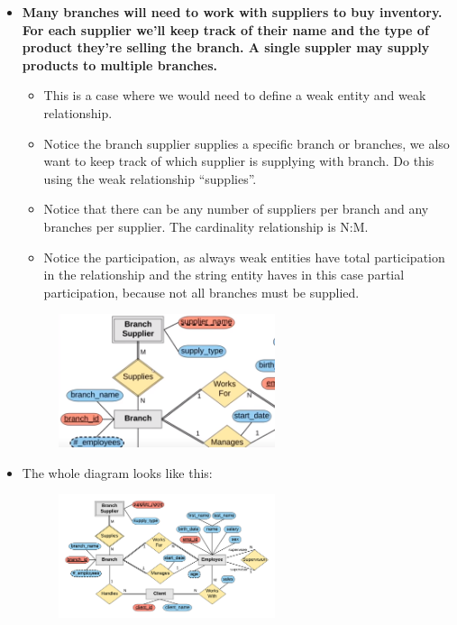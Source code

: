 \begin{itemize}
    \item \textbf{Many branches will need to work with suppliers to buy inventory. For each supplier we'll keep track of their name and the type of product they're selling the branch. A single suppler may supply products to multiple branches.}
        \begin{itemize}
            \item This is a case where we would need to define a weak entity and weak relationship.
            \item Notice the branch supplier supplies a specific branch or branches, we also want to keep track of which supplier is supplying with branch. Do this using the weak relationship ``supplies''.
            \item Notice that there can be any number of suppliers per branch and any branches per supplier. The cardinality relationship is N:M.
            \item Notice the participation, as always weak entities have total participation in the relationship and the string entity haves in this case partial participation, because not all branches must be supplied. 
        \end{itemize}
        \begin{figure}[H]
            \centering
            \includegraphics[width=0.6\textwidth]{./Figs/2020-12-24-00-48-35.png}
        \end{figure}
    
    \item The whole diagram looks like this:
        \begin{figure}[H]
            \centering
            \includegraphics[width=0.6\textwidth]{./Figs/2020-12-24-20-14-44.png}
        \end{figure}
\end{itemize}
